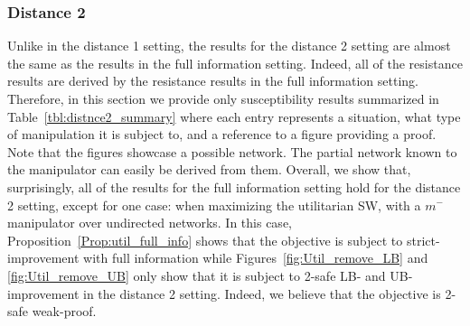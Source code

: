 \documentclass{article}
\newtheorem{conjecture}{Conjecture}
\begin{document}
\subsubsection{Distance 2}
\label{subsecdist-2}
Unlike in the distance 1 setting, the results for the distance 2 setting are almost the same as the results in the full information setting. Indeed, all of the resistance results are derived by the resistance results in the full information setting. Therefore, in this section we provide only  susceptibility results summarized in Table~\ref{tbl:distnce2_summary} where each entry represents a situation, what type of manipulation it is subject to, and a reference to a figure providing a proof. Note that the figures showcase a possible network. The partial network known to the manipulator can easily be derived from them. %
Overall, we show that, surprisingly, all of the results for the full information setting hold for the distance 2 setting, except for one case: when maximizing the utilitarian SW, with a $m^-$ manipulator over undirected networks. In this case, Proposition~\ref{Prop:util_full_info} shows that the objective is subject to strict-improvement with full information while Figures~\ref{fig:Util_remove_LB} and \ref{fig:Util_remove_UB} only show that it is subject to 2-safe LB- and UB-improvement in the distance 2 setting. Indeed, we believe that the objective is 2-safe weak-proof.
\end{document}
